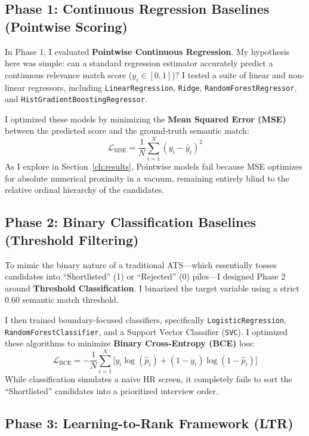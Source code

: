 \subsection{Phase 1: Continuous Regression Baselines (Pointwise Scoring)}

In Phase 1, I evaluated \textbf{Pointwise Continuous Regression}. My hypothesis here was simple: can a standard regression estimator accurately predict a continuous relevance match score ($y_i \in [0,1]$)? I tested a suite of linear and non-linear regressors, including \texttt{LinearRegression}, \texttt{Ridge}, \texttt{RandomForestRegressor}, and \texttt{HistGradientBoostingRegressor}.

I optimized these models by minimizing the \textbf{Mean Squared Error (MSE)} between the predicted score and the ground-truth semantic match:
\begin{equation}
\mathcal{L}_{\text{MSE}} = \frac{1}{N}\sum_{i=1}^{N} (y_i - \hat{y}_i)^2
\label{eq:eval_mse}
\end{equation}
As I explore in Section~\ref{ch:results}, Pointwise models fail because MSE optimizes for absolute numerical proximity in a vacuum, remaining entirely blind to the relative ordinal hierarchy of the candidates.

\subsection{Phase 2: Binary Classification Baselines (Threshold Filtering)}

To mimic the binary nature of a traditional ATS---which essentially tosses candidates into ``Shortlisted'' (1) or ``Rejected'' (0) piles---I designed Phase 2 around \textbf{Threshold Classification}. I binarized the target variable using a strict $0.60$ semantic match threshold.

I then trained boundary-focused classifiers, specifically \texttt{LogisticRegression}, \texttt{RandomForestClassifier}, and a Support Vector Classifier (\texttt{SVC}). I optimized these algorithms to minimize \textbf{Binary Cross-Entropy (BCE)} loss:
\begin{equation}
\mathcal{L}_{\text{BCE}} = -\frac{1}{N}\sum_{i=1}^{N} \big[y_i \log(\hat{p}_i) + (1-y_i)\log(1-\hat{p}_i)\big]
\label{eq:bce}
\end{equation}
While classification simulates a naive HR screen, it completely fails to sort the ``Shortlisted'' candidates into a prioritized interview order.

\subsection{Phase 3: Learning-to-Rank Framework (LTR)}


